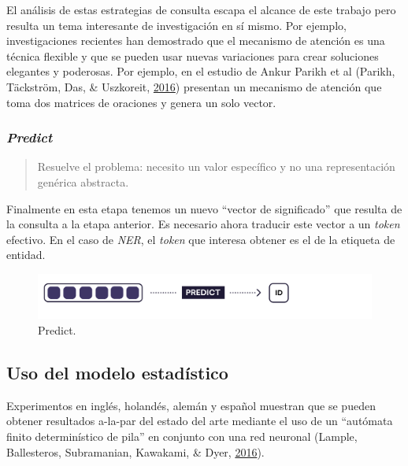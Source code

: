 \documentclass[12pt,a4paper,]{scrartcl}
\begin{document}
El análisis de estas estrategias de consulta escapa el alcance de este trabajo pero resulta un tema interesante de investigación en sí mismo. Por ejemplo, investigaciones recientes han demostrado que el mecanismo de atención es una técnica flexible y que se pueden usar nuevas variaciones para crear soluciones elegantes y poderosas. Por ejemplo, en el estudio de Ankur Parikh et al (Parikh, Täckström, Das, \& Uszkoreit, \protect\hyperlink{ref-parikh-etal-2016-decomposable}{2016}) presentan un mecanismo de atención que toma dos matrices de oraciones y genera un solo vector.

\hypertarget{predict}{%
\subsubsection{\texorpdfstring{\emph{Predict}}{Predict}}\label{predict}}

\begin{quote}
Resuelve el problema: necesito un valor específico y no una representación genérica abstracta.
\end{quote}

Finalmente en esta etapa tenemos un nuevo \enquote{vector de significado} que resulta de la consulta a la etapa anterior. Es necesario ahora traducir este vector a un \emph{token} efectivo. En el caso de \emph{NER}, el \emph{token} que interesa obtener es el de la etiqueta de entidad.

\begin{figure}[H]

{\centering \includegraphics{assets/deep-learning-formula-nlp_predict.pdf} 

}

\caption{Predict.}\label{fig:formula-predict}
\end{figure}

\hypertarget{use-of-cnn}{%
\subsection{Uso del modelo estadístico}\label{use-of-cnn}}

Experimentos en inglés, holandés, alemán y español muestran que se pueden obtener resultados a-la-par del estado del arte mediante el uso de un \enquote{autómata finito determinístico de pila} en conjunto con una red neuronal (Lample, Ballesteros, Subramanian, Kawakami, \& Dyer, \protect\hyperlink{ref-DBLP:journalsux2fcorrux2fLampleBSKD16}{2016}).
\end{document}
